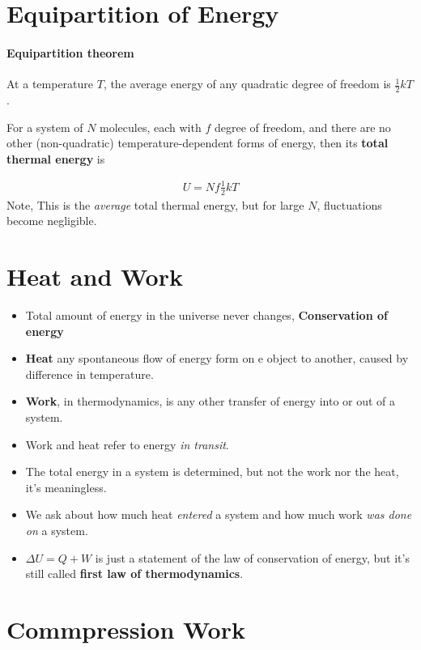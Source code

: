 \documentclass{book}
\begin{document}
\section{Equipartition of Energy}%
\label{sec:equi of energy}

\paragraph{Equipartition theorem} At a temperature $T$, the average energy of any
quadratic degree of freedom is $\frac{1}{2}kT$.

For a system of $N$ molecules, each with $f$ degree of freedom, and there are no other
(non-quadratic) temperature-dependent forms of energy, then its \textbf{total thermal energy} is

\begin{align}
U = Nf \frac{1}{2}kT
\end{align}
Note, This is the \textit{average} total thermal energy,
but for large $N$, fluctuations become negligible.


\section{Heat and Work}%
\label{sec:heat and work}

\begin{itemize}
  \item Total amount of energy in the universe never changes, \textbf{Conservation of energy}
  \item \textbf{Heat} any spontaneous flow of energy form on e object to another, caused by
        difference in temperature.
  \item \textbf{Work}, in thermodynamics, is any other transfer of energy into or out of a system.
  \item Work and heat refer to energy \textit{in transit}.
  \item The total energy in a system is determined, but not the work nor the heat, it's meaningless.
  \item We ask about how much heat \textit{entered} a system and how much work
        \textit{was done on} a system.
  \item $\Delta{U} = Q + W$
        is just a statement of the law of conservation of energy, but it's still called
        \textbf{first law of thermodynamics}.
\end{itemize}

 \section{Commpression Work}%
 \label{sec:Compression Work}
\end{document}
